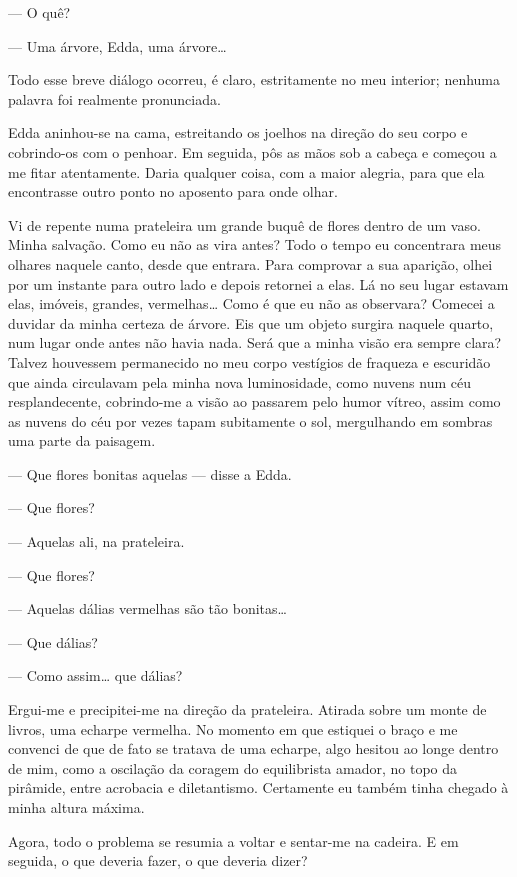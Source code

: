 --- O quê?

--- Uma árvore, Edda, uma árvore\ldots{}

Todo esse breve diálogo ocorreu, é claro, estritamente no meu interior; nenhuma palavra foi realmente pronunciada.

Edda aninhou-se na cama, estreitando os joelhos na direção do seu corpo e cobrindo-os com o penhoar. Em seguida, pôs as mãos sob a cabeça e começou a me fitar atentamente. Daria qualquer coisa, com a maior alegria, para que ela encontrasse outro ponto no aposento para onde olhar.

Vi de repente numa prateleira um grande buquê de flores dentro de um vaso. Minha salvação.
Como eu não as vira antes? Todo o tempo eu concentrara meus olhares naquele canto, desde que entrara. Para comprovar a sua aparição, olhei por um instante para outro lado e depois retornei a elas. Lá no seu lugar estavam elas, imóveis, grandes, vermelhas\ldots{} Como é que eu não as observara? Comecei a duvidar da minha certeza de árvore. Eis que um objeto surgira naquele quarto, num lugar onde antes não havia nada. Será que a minha visão era sempre clara? Talvez houvessem permanecido no meu corpo vestígios de fraqueza e escuridão que ainda circulavam pela minha nova luminosidade, como nuvens num céu resplandecente, cobrindo-me a visão ao passarem pelo humor vítreo, assim como as nuvens do céu por vezes tapam subitamente o sol, mergulhando em sombras uma parte da paisagem.

--- Que flores bonitas aquelas --- disse a Edda.

--- Que flores?

--- Aquelas ali, na prateleira.

--- Que flores?

--- Aquelas dálias vermelhas são tão bonitas\ldots{}

--- Que dálias?

--- Como assim\ldots{} que dálias?

Ergui-me e precipitei-me na direção da prateleira. Atirada sobre um monte de livros, uma echarpe vermelha. No momento em que estiquei o braço e me convenci de que de fato se tratava de uma echarpe, algo hesitou ao longe dentro de mim, como a oscilação da coragem do equilibrista amador, no topo da pirâmide, entre acrobacia e diletantismo. Certamente eu também tinha chegado à minha altura máxima.

Agora, todo o problema se resumia a voltar e sentar-me na cadeira. E em seguida, o que deveria fazer, o que deveria dizer?

